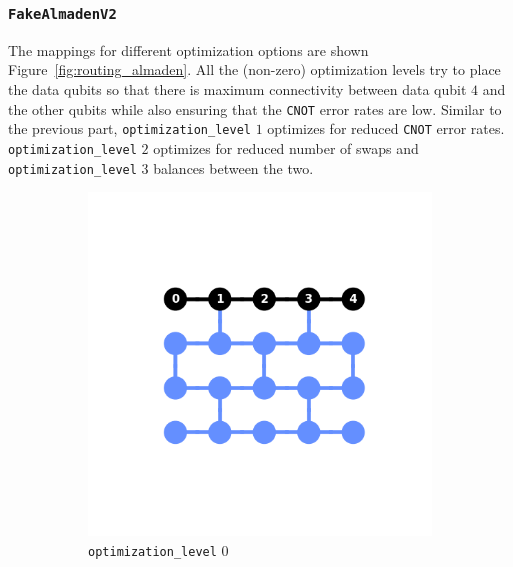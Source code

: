 \documentclass[11pt]{article}
\begin{document}
\subsubsection{\texttt{FakeAlmadenV2}}
The mappings for different optimization options are shown Figure~\ref{fig:routing_almaden}. All the (non-zero) optimization levels try to place the data qubits so that there is maximum connectivity between data qubit $4$ and the other qubits while also ensuring that the \texttt{CNOT} error rates are low. Similar to the previous part, \texttt{optimization\_level} $1$ optimizes for reduced \texttt{CNOT} error rates. \texttt{optimization\_level} $2$ optimizes for reduced number of swaps and \texttt{optimization\_level} $3$ balances between the two.
\begin{figure}[hbtp]
    \begin{subfigure}{0.24\linewidth}
        \centering
        \includegraphics[width=\linewidth]{outputs/routing_FakeAlmadenV2_0.png}
        \caption{\texttt{optimization\_level} $0$}
    \end{subfigure}
    \begin{subfigure}{0.24\linewidth}
        \centering

\end{subfigure}
\end{figure}
\end{document}
